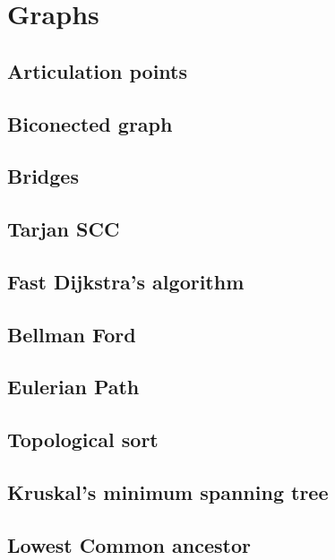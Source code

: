 \section{Graphs}
\subsection{Articulation points}
\raggedbottom
\hrulefill
\subsection{Biconected graph}
\raggedbottom
\hrulefill
\subsection{Bridges}
\raggedbottom
\hrulefill
\subsection{Tarjan SCC}
\raggedbottom
\hrulefill
\subsection{Fast Dijkstra's algorithm}
\raggedbottom
\hrulefill
\subsection{Bellman Ford}
\raggedbottom
\hrulefill
\subsection{Eulerian Path}
\raggedbottom
\hrulefill
\subsection{Topological sort}
\raggedbottom
\hrulefill
\subsection{Kruskal's minimum spanning tree}
\raggedbottom
\hrulefill
\subsection{Lowest Common ancestor}
\raggedbottom
\hrulefill

